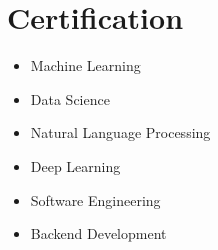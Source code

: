 \section{Certification}
\begin{flushleft}
    \begin{minipage}[t]{0.33\textwidth}
            \begin{itemize}
                \item Machine Learning
                \item Data Science
            \end{itemize}
    \end{minipage}%
    \begin{minipage}[t]{0.4\textwidth}
            \begin{itemize}
                \item Natural Language Processing
                \item Deep Learning
            \end{itemize}
    \end{minipage}%
    \begin{minipage}[t]{0.24\textwidth}
            \begin{itemize}
                \item Software Engineering
                \item Backend Development
            \end{itemize}
    \end{minipage}
\end{flushleft}